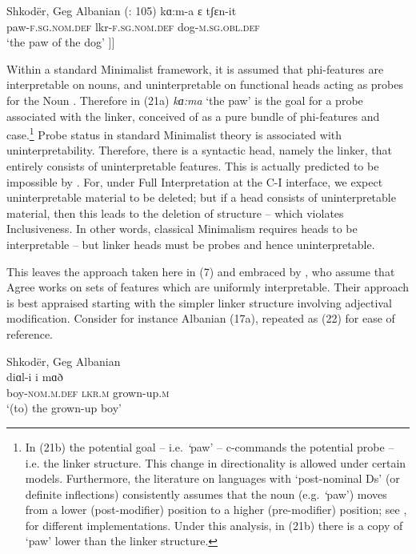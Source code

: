 \documentclass[output=paper]{langsci/langscibook}
\begin{document}
\ea%
    \label{ex:manzini:21}
    \ea Shkodër, Geg Albanian (\citealt{Manzini2011Reducing}: 105)
    \gll kɑ:m-a      ɛ          tʃɛn-it          \\
         paw-\textsc{f.sg.nom.def}   lkr-\textsc{f.sg.nom.def}  dog-\textsc{m.sg.obl.def} \\
    \glt ‘the paw of the dog’
    \ex\relax [\textsubscript{DP} kɑ:ma    [\textsubscript{Lkr} ɛ  [\textsubscript{DP} tʃɛnit ]]] 
    \z
\z

 Within a standard Minimalist framework, it is assumed that phi-features are interpretable on nouns, and uninterpretable on functional heads acting as probes for the Noun \citep{Carstens2001}. Therefore in (21a) \textit{kɑ:ma} ‘the paw’ is the goal for a probe associated with the linker, conceived of as a pure bundle of phi-features and case.\footnote{In (21b) the potential goal – i.e. \textit{‘}paw’ – c-commands the potential probe – i.e. the linker structure. This change in directionality is allowed under certain models. Furthermore, the literature on languages with ‘post-nominal Ds’ (or definite inflections) consistently assumes that the noun (e.g. \textit{‘}paw’) moves from a lower (post-modifier) position to a higher (pre-modifier) position; see \citet{Turano2002}, \citet{Dimitrova-Vulchanova1998} for different implementations. Under this analysis, in (21b) there is a copy of ‘paw’ lower than the linker structure.} Probe status in standard Minimalist theory is associated with uninterpretability. Therefore, there is a syntactic head, namely the linker, that entirely consists of uninterpretable features. This is actually predicted to be impossible by \citet{Chomsky1995}. For, under Full Interpretation at the C-I interface, we expect uninterpretable material to be deleted; but if a head consists of uninterpretable material, then this leads to the deletion of structure – which violates Inclusiveness. In other words, classical Minimalism requires heads to be interpretable – but linker heads must be probes and hence uninterpretable. 

  This leaves the approach taken here in (7) and embraced by \citet{Franco2015}, who assume that Agree works on sets of features which are uniformly interpretable. Their approach is best appraised starting with the simpler linker structure involving adjectival modification. Consider for instance Albanian (17a), repeated as (22) for ease of reference. 

\ea%
    Shkodër, Geg Albanian\label{ex:manzini:22}\\
    \gll diɑl-i       i   mɑð       \\
         boy-\textsc{nom.m.def}   \textsc{lkr.m}  grown-up.\textsc{m}  \\
    \glt ‘(to) the grown-up boy’ 
    \z
\end{document}
